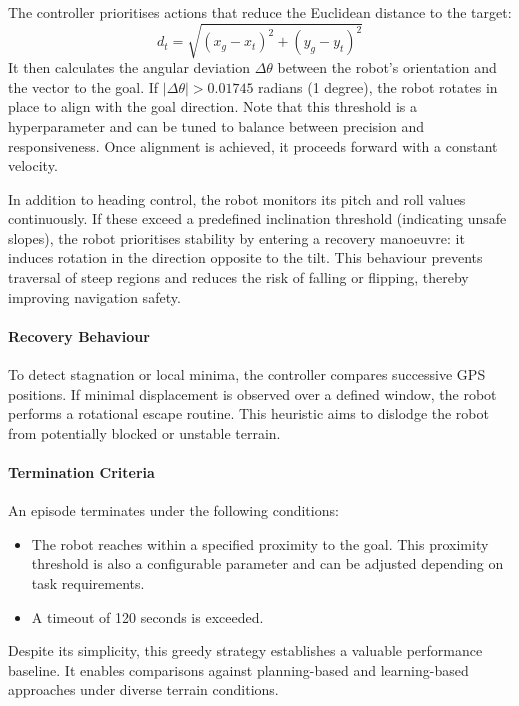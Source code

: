\documentclass[conference]{IEEEtran}
\begin{document}
The controller prioritises actions that reduce the Euclidean distance to the target:
\[
d_t = \sqrt{(x_g - x_t)^2 + (y_g - y_t)^2}
\]
It then calculates the angular deviation \(\Delta\theta\) between the robot's orientation and the vector to the goal. If \(|\Delta\theta| > 0.01745\) radians (1 degree), the robot rotates in place to align with the goal direction. Note that this threshold is a hyperparameter and can be tuned to balance between precision and responsiveness. Once alignment is achieved, it proceeds forward with a constant velocity.

In addition to heading control, the robot monitors its pitch and roll values continuously. If these exceed a predefined inclination threshold (indicating unsafe slopes), the robot prioritises stability by entering a recovery manoeuvre: it induces rotation in the direction opposite to the tilt. This behaviour prevents traversal of steep regions and reduces the risk of falling or flipping, thereby improving navigation safety.

\paragraph{Recovery Behaviour}

To detect stagnation or local minima, the controller compares successive GPS positions. If minimal displacement is observed over a defined window, the robot performs a rotational escape routine. This heuristic aims to dislodge the robot from potentially blocked or unstable terrain.

\paragraph{Termination Criteria}

An episode terminates under the following conditions:

\begin{itemize}
    \item The robot reaches within a specified proximity to the goal. This proximity threshold is also a configurable parameter and can be adjusted depending on task requirements.
    \item A timeout of 120 seconds is exceeded.
\end{itemize}

Despite its simplicity, this greedy strategy establishes a valuable performance baseline. It enables comparisons against planning-based and learning-based approaches under diverse terrain conditions.
\end{document}
